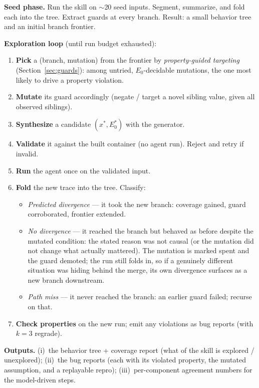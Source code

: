 \documentclass[11pt]{article}
\begin{document}
\begin{tcolorbox}[colback=blue!4,boxrule=0.5pt]
\small
\textbf{Seed phase.} Run the skill on $\sim$20 seed inputs. Segment, summarize,
and fold each into the tree. Extract guards at every branch. Result: a small
behavior tree and an initial branch frontier.

\smallskip
\textbf{Exploration loop} (until run budget exhausted):
\begin{enumerate}[leftmargin=1.4em, itemsep=1pt, topsep=2pt]
  \item \textbf{Pick} a (branch, mutation) from the frontier by
  \emph{property-guided targeting} (Section~\ref{sec:guards}): among untried,
  $E_0$-decidable mutations, the one most likely to drive a property violation.
  \item \textbf{Mutate} its guard accordingly (negate / target a novel sibling
  value, given all observed siblings).
  \item \textbf{Synthesize} a candidate $(x^*, E_0^*)$ with the generator.
  \item \textbf{Validate} it against the built container (no agent run). Reject
  and retry if invalid.
  \item \textbf{Run} the agent once on the validated input.
  \item \textbf{Fold} the new trace into the tree. Classify:
  \begin{itemize}[leftmargin=1.2em, topsep=1pt]
    \item \emph{Predicted divergence} --- it took the new branch: coverage
    gained, guard corroborated, frontier extended.
    \item \emph{No divergence} --- it reached the branch but behaved as before
    despite the mutated condition: the stated reason was not causal (or the
    mutation did not change what actually mattered). The mutation is marked
    spent and the guard demoted; the run still folds in, so if a genuinely
    different situation was hiding behind the merge, its own divergence
    surfaces as a new branch downstream.
    \item \emph{Path miss} --- it never reached the branch: an earlier guard
    failed; recurse on that.
  \end{itemize}
  \item \textbf{Check properties} on the new run; emit any violations as bug
  reports (with $k{=}3$ regrade).
\end{enumerate}

\smallskip
\textbf{Outputs.} (i)~the behavior tree + coverage report (what of the skill is
explored / unexplored); (ii)~the bug reports (each with its violated property,
the mutated assumption, and a replayable repro); (iii)~per-component agreement
numbers for the model-driven steps.
\end{tcolorbox}
\end{document}
